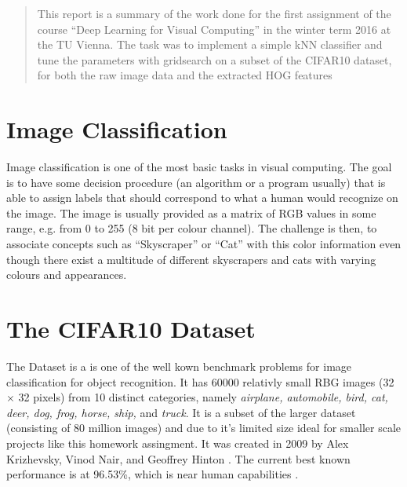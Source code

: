 \newcommand{\ttitle}{kNN Classification and Histograms of Oriented Gradients}
\hyphenation{}
\maketitle



\begin{abstract}
This report is a summary of the work done for the first assignment of the course ``Deep Learning for Visual Computing'' in the winter term 2016 at the TU Vienna. The task was to implement a simple kNN classifier and tune the parameters with gridsearch on a subset of the CIFAR10 dataset, for both the raw image data and the extracted HOG features
\end{abstract}



\section{Image Classification} %
Image classification is one of the most basic tasks in visual computing. The goal is to have some decision procedure (an algorithm or a program usually) that is able to assign labels that should correspond to what a human would recognize on the image. The image is usually provided as a matrix of RGB values in some range, e.g. from 0 to 255 (8 bit per colour channel). The challenge is then, to associate concepts such as ``Skyscraper'' or ``Cat'' with this color information even though there exist a multitude of different skyscrapers and cats with varying colours and appearances.

\section{The CIFAR10 Dataset} %
The  Dataset is a is one of the well kown benchmark problems for image classification for object recognition. It has 60000 relativly small RBG images (32 $\times$ 32 pixels) from 10 distinct categories, namely \emph{airplane, automobile, bird, cat, deer, dog, frog, horse, ship,} and \emph{truck}. It is a subset of the larger  dataset (consisting of 80 million images) and due to it's limited size ideal for smaller scale projects like this homework assingment. It was created in 2009 by Alex Krizhevsky, Vinod Nair, and Geoffrey Hinton\cite{CIFAR10} \cite{Krizhevsky09learningmultiple}. The current best known performance is at 96.53\%, which is near human capabilities \cite{Graham14a}.



